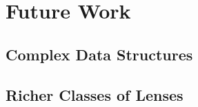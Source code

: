 \section{Future Work}
\label{sec:future}
\subsection{Complex Data Structures}
\subsection{Richer Classes of Lenses}
